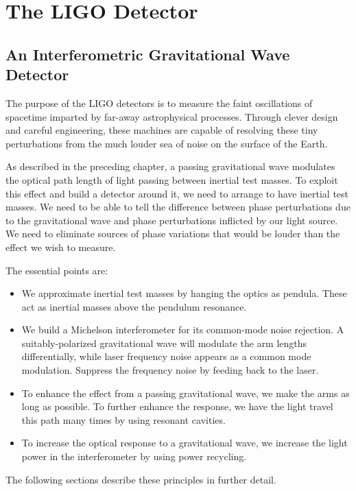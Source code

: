 \chapter{The LIGO Detector}
\label{chapter2}

\section{An Interferometric Gravitational Wave Detector}

The purpose of the LIGO detectors is to measure the faint
oscillations of spacetime imparted by far-away astrophysical
processes.  Through clever design and careful engineering, these
machines are capable of resolving these tiny perturbations from the
much louder sea of noise on the surface of the Earth\cite{Saulson1994Fundamentals}.

As described in the preceding chapter, a passing gravitational wave modulates the optical
path length of light passing between inertial test
masses.  To exploit this effect and build a detector around it, we
need to arrange to have inertial test masses.  We need to be able to
tell the difference between phase perturbations due to the
gravitational wave and phase perturbations inflicted by our light
source.  We need to eliminate sources of phase variations that would
be louder than the effect we wish to measure.  

The essential points are:
\begin{itemize}
\item We approximate inertial test masses by hanging the optics as
  pendula.  These act as inertial masses above the pendulum resonance.
\item We build a Michelson interferometer for its common-mode noise
  rejection.  A suitably-polarized gravitational wave will modulate
  the arm lengths differentially, while laser frequency noise appears
  as a common mode modulation.  Suppress the frequency noise by
  feeding back to the laser.
\item To enhance the effect from a passing gravitational wave, we make
  the arms as long as possible.  To further enhance the response, we
  have the light travel this path many times by using resonant cavities.
\item To increase the optical response to a gravitational wave, we
  increase the light power in the interferometer by using power
  recycling.
\end{itemize}
The following sections describe these principles in further detail.

